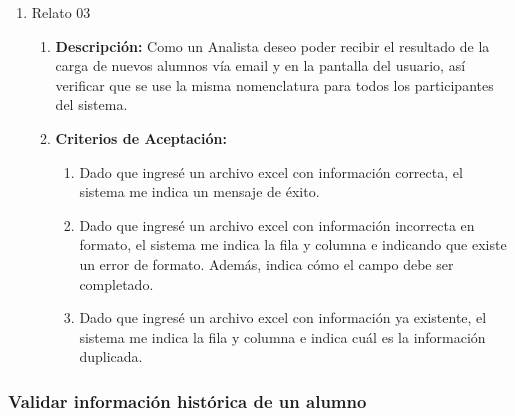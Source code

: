 \begin{enumerate}
	\item Relato 03
		\begin{enumerate}
			\item \textbf{Descripción:} Como un Analista deseo poder recibir el resultado de la carga de nuevos alumnos vía email y en la pantalla del usuario, así verificar que se use la misma nomenclatura para todos los participantes del sistema.
			\item \textbf{Criterios de Aceptación:}
				\begin{enumerate}
					\item Dado que ingresé un archivo excel con información correcta, el sistema me indica un mensaje de éxito.
					\item Dado que ingresé un archivo excel con información incorrecta en formato, el sistema me indica la fila y columna e indicando que existe un error de formato. Además, indica cómo el campo debe ser completado.
					\item Dado que ingresé un archivo excel con información ya existente, el sistema me indica la fila y columna e indica cuál es la información duplicada.
				\end{enumerate}
		\end{enumerate}
\end{enumerate}

\subsubsection{Validar información histórica de un alumno}

